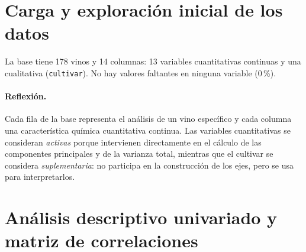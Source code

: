 \documentclass[11pt,a4paper]{article}
\newcommand{\var}[1]{\texttt{#1}}
\begin{document}
\section{Carga y exploración inicial de los datos}

La base tiene 178 vinos y 14 columnas: 13 variables cuantitativas continuas y una cualitativa (\var{cultivar}). No hay valores faltantes en ninguna variable (0\,\%).

\paragraph{Reflexión.} Cada fila de la base representa el análisis de un vino específico y cada columna una característica química cuantitativa continua. Las variables cuantitativas se consideran \emph{activas} porque intervienen directamente en el cálculo de las componentes principales y de la varianza total, mientras que el cultivar se considera \emph{suplementaria}: no participa en la construcción de los ejes, pero se usa para interpretarlos.

\section{Análisis descriptivo univariado y matriz de correlaciones}
\end{document}
